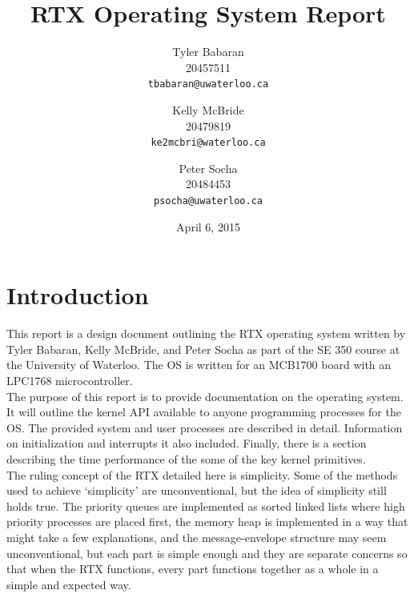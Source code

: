 \documentclass[12pt]{report}
\begin{document}
\title{RTX Operating System Report}

\author{
    Tyler Babaran\\
		20457511\\
    \texttt{tbabaran@uwaterloo.ca}
    \and
    Kelly McBride\\
		20479819\\
    \texttt{ke2mcbri@waterloo.ca}
    \and
    Peter Socha\\
		20484453\\
    \texttt{psocha@uwaterloo.ca}
}

\date{April 6, 2015}

\maketitle


\tableofcontents
\listofalgorithms
\listoffigures

\chapter{Introduction}

This report is a design document outlining the RTX operating system written by Tyler Babaran, Kelly McBride, and Peter Socha as part of the SE 350 course at the University of Waterloo. The OS is written for an MCB1700 board with an LPC1768 microcontroller.\\

The purpose of this report is to provide documentation on the operating system. It will outline the kernel API available to anyone programming processes for the OS. The provided system and user processes are described in detail. Information on initialization and interrupts it also included. Finally, there is a section describing the time performance of the some of the key kernel primitives.\\

The ruling concept of the RTX detailed here is simplicity. Some of the methods used
to achieve `simplicity' are unconventional, but the idea of simplicity still holds
true. The priority queues are implemented as sorted linked lists where high priority
processes are placed first, the memory heap is implemented in a way that might 
take a few explanations, and the message-envelope structure may seem unconventional,
but each part is simple enough and they are separate concerns so that when the RTX
functions, every part functions together as a whole in a simple and expected way.
\end{document}
